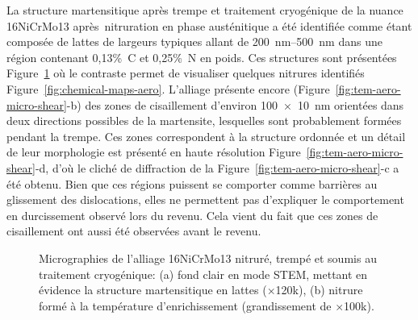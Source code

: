 
La structure martensitique après trempe et traitement cryogénique de la nuance 16NiCrMo13 après nitruration en phase austénitique a été identifiée comme étant composée de lattes de largeurs typiques allant de \SIrange{200}{500}{\nano\metre} dans une région contenant 0,13\%~C et 0,25\%~N en poids. Ces structures sont présentées Figure~\ref{fig:tem-aero-micro-laths} où le contraste permet de visualiser quelques nitrures  identifiés Figure~\ref{fig:chemical-maps-aero}. L'alliage présente encore (Figure~\ref{fig:tem-aero-micro-shear}-b) des zones de cisaillement d'environ \SI{100 x 10}{\nano\metre} orientées dans deux directions possibles de la martensite, lesquelles sont probablement formées pendant la trempe. Ces zones correspondent à la structure ordonnée  et un détail de leur morphologie est présenté en haute résolution Figure~\ref{fig:tem-aero-micro-shear}-d, d'où le cliché de diffraction de la Figure~\ref{fig:tem-aero-micro-shear}-c a été obtenu. Bien que ces régions puissent se comporter comme barrières au glissement des dislocations, elles ne permettent pas d'expliquer le comportement en durcissement observé lors du revenu. Cela vient du fait que ces zones de cisaillement ont aussi été observées avant le revenu. %

\begin{figure}[h]
  \centering{}

  \caption{\label{fig:tem-aero-micro-laths}Micrographies de l'alliage 16NiCrMo13 nitruré, trempé et soumis au traitement cryogénique: (a) fond clair en mode STEM, mettant en évidence la structure martensitique en lattes ($\times$120k), (b) nitrure  formé à la température d'enrichissement (grandissement de $\times$100k).}
\end{figure}

